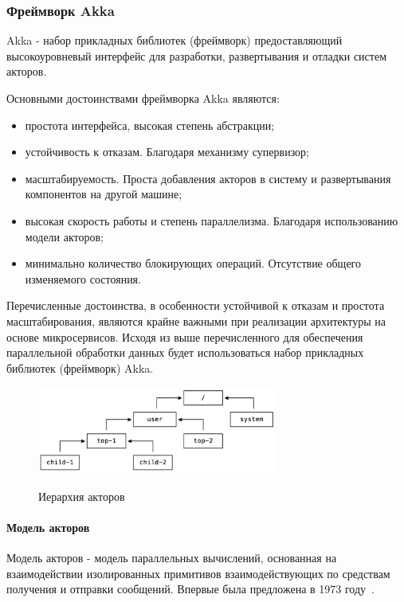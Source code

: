 \subsubsection{Фреймворк Akka}
\label{sec:techs:akka}

Akka - набор прикладных библиотек (фреймворк) предоставляющий высокоуровневый интерфейс для разработки, развертывания и отладки систем акторов.

Основными достоинствами фреймворка Akka являются:
\begin{itemize}
  \item простота интерфейса, высокая степень абстракции;
  \item устойчивость к отказам. Благодаря механизму супервизор;
  \item масштабируемость. Проста добавления акторов в систему и развертывания компонентов на другой машине;
  \item высокая скорость работы и степень параллелизма. Благодаря использованию модели акторов;
  \item минимально количество блокирующих операций. Отсутствие общего изменяемого состояния.
\end{itemize}

Перечисленные достоинства, в особенности устойчивой к отказам и простота масштабирования, являются крайне важными при реализации архитектуры на основе микросервисов. Исходя из выше перечисленного для обеспечения параллельной обработки данных будет использоваться набор прикладных библиотек (фреймворк) Akka. 

\begin{figure}[ht]
    \centering
    \includegraphics[width=0.7\textwidth]{figures/actors_hier.png}
    \label{fig:techs:akka:actor_hierar}
    \caption{Иерархия акторов}
\end{figure}

\paragraph{Модель акторов}
\label{sec:techs:akka:actor_model}
Модель акторов - модель параллельных вычислений, основанная на взаимодействии изолированных примитивов взаимодействующих по средствам получения и отправки сообщений. Впервые была предложена в 1973 году~\cite{hewitt_bishop_steiger_actor_model}.

